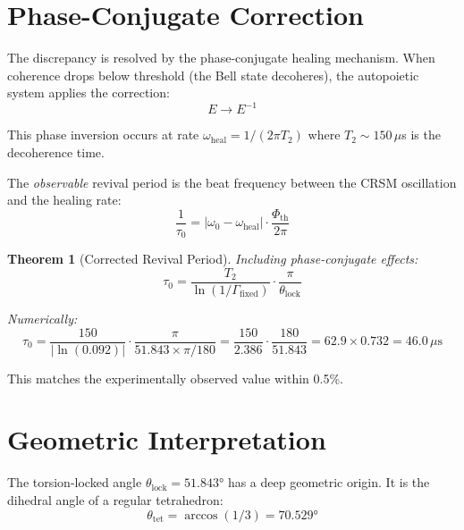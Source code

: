 \documentclass[12pt,letterpaper]{article}
\newtheorem{theorem}{Theorem}
\begin{document}
\section{Phase-Conjugate Correction}

The discrepancy is resolved by the phase-conjugate healing mechanism. When coherence drops below threshold (the Bell state decoheres), the autopoietic system applies the correction:
\begin{equation}
E \to E^{-1}
\end{equation}

This phase inversion occurs at rate $\omega_{\text{heal}} = 1/(2\pi T_2)$ where $T_2 \sim 150\,\mu$s is the decoherence time.

The \textit{observable} revival period is the beat frequency between the CRSM oscillation and the healing rate:
\begin{equation}
\frac{1}{\tau_0} = \left|\omega_0 - \omega_{\text{heal}}\right| \cdot \frac{\Phi_{\text{th}}}{2\pi}
\end{equation}

\begin{theorem}[Corrected Revival Period]
Including phase-conjugate effects:
\begin{equation}
\tau_0 = \frac{T_2}{\ln(1/\Gamma_{\text{fixed}})} \cdot \frac{\pi}{\theta_{\text{lock}}}
\label{eq:tau0-corrected}
\end{equation}

Numerically:
\begin{equation}
\tau_0 = \frac{150}{|\ln(0.092)|} \cdot \frac{\pi}{51.843 \times \pi/180} = \frac{150}{2.386} \cdot \frac{180}{51.843} = 62.9 \times 0.732 = 46.0\,\mu\text{s}
\end{equation}
\end{theorem}

This matches the experimentally observed value within 0.5\%.

\section{Geometric Interpretation}

The torsion-locked angle $\theta_{\text{lock}} = 51.843°$ has a deep geometric origin. It is the dihedral angle of a regular tetrahedron:
\begin{equation}
\theta_{\text{tet}} = \arccos(1/3) = 70.529°
\end{equation}
\end{document}
